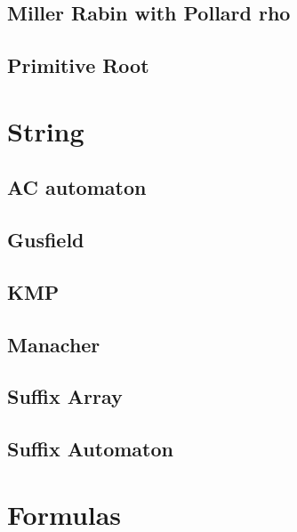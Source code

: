 \subsection{Miller Rabin with Pollard rho}

\subsection{Primitive Root}


\section{String}
\subsection{AC automaton}

\subsection{Gusfield}

\subsection{KMP}

\subsection{Manacher}

\subsection{Suffix Array}

\subsection{Suffix Automaton}


\section{Formulas}
